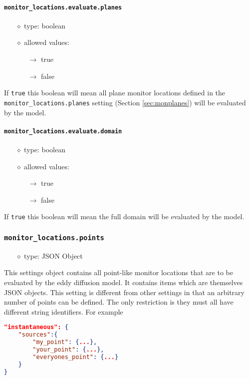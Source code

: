 \documentclass[]{article}
\def\code#1{\texttt{#1}}
\begin{document}
\paragraph{\code{monitor\_locations.evaluate.planes}}
\begin{itemize}
    \item[$\diamond$] type: boolean
    \item[$\diamond$] allowed values:
    \begin{itemize}
        \item[$\rightarrow$] true
        \item[$\rightarrow$] false
    \end{itemize}
\end{itemize}
If \code{true} this boolean will mean all plane monitor locations defined in the
\code{monitor\_locations.planes} setting (Section \ref{sec:monplanes}) will be
evaluated by the model.

\paragraph{\code{monitor\_locations.evaluate.domain}}
\begin{itemize}
    \item[$\diamond$] type: boolean
    \item[$\diamond$] allowed values:
    \begin{itemize}
        \item[$\rightarrow$] true
        \item[$\rightarrow$] false
    \end{itemize}
\end{itemize}
If \code{true} this boolean will mean the full domain  will be evaluated by the
model. 


\subsubsection{\code{monitor\_locations.points}}\label{sec:monpoints}
\begin{itemize}
    \item[$\diamond$] type: JSON Object 
\end{itemize}
This settings object contains all point-like monitor locations that are to be
evaluated by the eddy diffusion model. It contains items which
are themselves JSON objects. This setting is different from other settings in
that an arbitrary number of points can be defined. The only restriction is they
must all have different string identifiers. For example\\
\begin{lstlisting}[language=json,firstnumber=1]
"instantaneous": {
    "sources":{
        "my_point": {...},
        "your_point": {...},
        "everyones_point": {...}
    }
}
\end{lstlisting}
\end{document}
